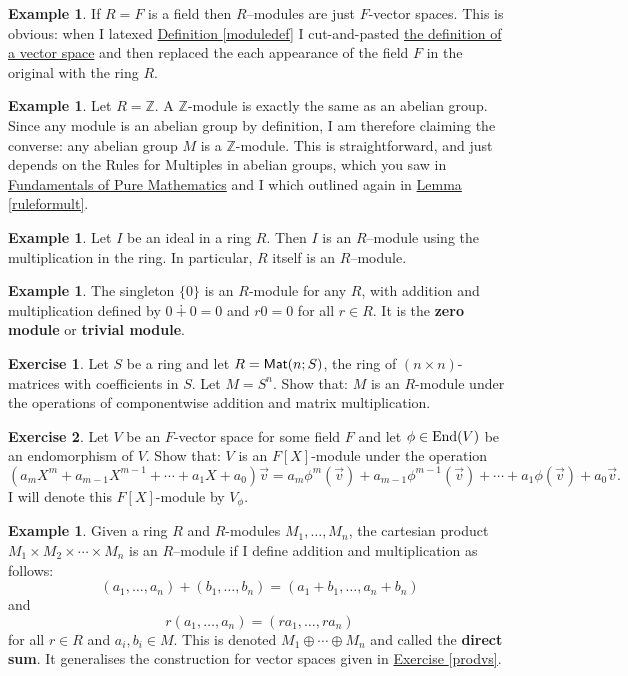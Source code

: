 \documentclass[11pt]{amsbook}
\theoremstyle{definition}
\newtheorem{ex}[theorem]{Example}
\newtheorem{exercise}{Exercise}
\begin{document}
 \begin{ex}
If $R=F$ is a field then $R$--modules are just $F$-vector spaces. This is obvious: when I latexed \hyperref[moduledef]{Definition \ref{moduledef}} I cut-and-pasted \hyperref[vsdef]{the definition of a vector space} and then replaced the each appearance of the field $F$ in the original with the ring $R$.
 \end{ex}
 \begin{ex}
Let $R = \mathbb{Z}$. A $\mathbb{Z}$-module is exactly the same as an abelian group. Since any module is an abelian group by definition, I am therefore claiming the converse: any abelian group $M$ is a $\mathbb{Z}$-module. This is straightforward, and just depends on the Rules for Multiples in abelian groups, which you saw in \href{http://www.drps.ed.ac.uk/12-13/dpt/cxmath08064.htm}{Fundamentals of Pure Mathematics} and I which outlined again in \hyperref[ruleformult]{Lemma \ref{ruleformult}}.
 \end{ex}
 \begin{ex}
 Let $I$ be an ideal in a ring $R$. Then $I$ is an
 $R$--module using the multiplication in the ring. In particular,
 $R$ itself is an $R$--module.
  \end{ex}
  \begin{ex}
  The singleton $\{ 0 \}$ is an $R$-module for any $R$, with addition and multiplication defined by $0 \dotplus 0 = 0$ and $r0 = 0$ for all $r\in R$. It is the {\bf zero module} or {\bf trivial module}.
  \end{ex}
  \begin{exercise} \label{matexmod} Let $S$ be a ring and let $R = {\sf Mat}(n; S)$, the ring of $(n\times n)$-matrices with coefficients in $S$. Let $M = S^n$. Show that: $M$ is an $R$-module under the operations of componentwise addition and matrix multiplication.
  \end{exercise}
  \begin{exercise}\label{forlater}
  Let $V$ be an $F$-vector space for some field $F$ and let $\phi\in {\rm End}(V)$ be an endomorphism of $V$. Show that: $V$ is an $F[X]$-module under the operation $$ (a_mX^m + a_{m-1}X^{m-1} + \cdots +a_1X + a_0 ) \vec v =  a_m\phi^m(\vec{v}) + a_{m-1}\phi^{m-1}(\vec{v}) + \cdots +a_1\phi(\vec{v}) + a_0 \vec{v}.$$ I will denote this $F[X]$-module by $V_\phi$.
    \end{exercise}

 \begin{ex}
Given a ring $R$ and $R$-modules $M_1, \ldots, M_n$, the cartesian product  $M_1\times M_2\times \cdots \times
 M_n$ is an $R$--module if I define addition and multiplication as follows:
 $$
 (a_1, \ldots, a_n) + (b_1, \ldots, b_n) = (a_1 + b_1 , \ldots
 , a_n + b_n)$$ and $$ r(a_1,\ldots , a_n) = (ra_1, \ldots ,
 ra_n)$$ for all $r\in R$ and $a_i, b_i \in M$.
 This is denoted $M_1 \oplus \cdots \oplus M_n$ and called the {\bf
 direct sum}. It generalises the construction for vector spaces given in \hyperref[prodvs]{Exercise \ref{prodvs}}.
 \end{ex}
\end{document}
